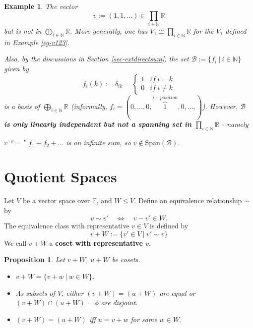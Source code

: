 \documentclass[12pt]{amsbook}
\newtheorem{example}[theorem]{Example}
\newtheorem{proposition}[theorem]{Proposition}
\begin{document}
\begin{example}
The vector 
    $$v := (1,1, \dots ) \in \prod_{i \in \mathbb{N}} \mathbb{R}$$
but is not in $\bigoplus_{i \in \mathbb{N}} \mathbb{R}$. More generally, one has $V_1 \cong \prod_{i \in \mathbb{N}} \mathbb{R}$ for the $V_1$ defined in Example \ref{eg-v123}.

Also, by the discussions in Section \ref{sec-extdirectsum}, the set 
$\mathcal{B} := \{f_i\ |\ i \in \mathbb{N}\}$
given by 
$$f_i(k) := \delta_{ik} = \begin{cases} 1 & if\ i = k \\ 0 & if\ i \neq k \end{cases}$$ is a basis of $\bigoplus_{i \in \mathbb{N}} \mathbb{R}$ (informally, $f_i = (0, \dots, 0, \overbrace{1}^{i-position}, 0, \dots, )$). However, {\bf $\mathcal{B}$ is only linearly independent but  not a spanning set in $\prod_{i \in \mathbb{N}} \mathbb{R}$} - namely
\begin{center}
    $v$ ``$=$'' $f_1 + f_2 + \dots$ is an infinite sum, so $v \notin \mathrm{Span}(\mathcal{B})$.
\end{center}
\end{example}


\section{Quotient Spaces}
Let $V$ be a vector space over $\mathbb{F}$, and $W \leq V$. Define an equivalence relationship $\sim$ by
$$v \sim v' \quad \Longleftrightarrow \quad v - v' \in W.$$
The equivalence class with representative $v \in V$ is defined by
$$v + W := \{v' \in V\ |\ v' \sim v\}$$
We call $v + W$ a {\bf coset with representative $v$}.

\begin{proposition} \label{prop-samecoset}
Let $v + W$, $u + W$ be cosets.
\begin{itemize}
    \item $v + W = \{v + w\ |\ w \in W\}$.
    \item As subsets of $V$, either $(v + W) = (u + W)$ are equal or $(v + W) \cap (u + W) = \phi$ are disjoint.
    \item $(v + W) = (u + W)$ iff $u = v+w$ for some $w \in W$.
\end{itemize}
\end{proposition}
\end{document}
